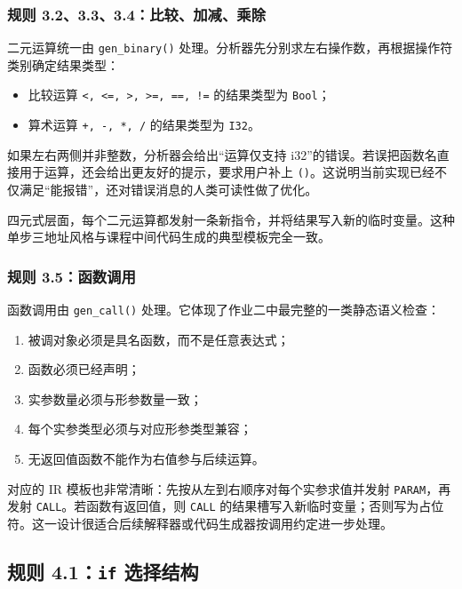 \documentclass[UTF8,a4paper,12pt]{ctexart}
\newcommand{\pkg}[1]{\texttt{#1}}
\newcommand{\op}[1]{\texttt{#1}}
\begin{document}
\subsubsection{规则 3.2、3.3、3.4：比较、加减、乘除}

二元运算统一由 \pkg{gen\_binary()} 处理。分析器先分别求左右操作数，再根据操作符类别确定结果类型：

\begin{itemize}
    \item 比较运算 \pkg{<, <=, >, >=, ==, !=} 的结果类型为 \pkg{Bool}；
    \item 算术运算 \pkg{+, -, *, /} 的结果类型为 \pkg{I32}。
\end{itemize}

如果左右两侧并非整数，分析器会给出“运算仅支持 i32”的错误。若误把函数名直接用于运算，还会给出更友好的提示，要求用户补上 \pkg{()}。这说明当前实现已经不仅满足“能报错”，还对错误消息的人类可读性做了优化。

四元式层面，每个二元运算都发射一条新指令，并将结果写入新的临时变量。这种单步三地址风格与课程中间代码生成的典型模板完全一致。

\subsubsection{规则 3.5：函数调用}

函数调用由 \pkg{gen\_call()} 处理。它体现了作业二中最完整的一类静态语义检查：

\begin{enumerate}[label=\arabic*.]
    \item 被调对象必须是具名函数，而不是任意表达式；
    \item 函数必须已经声明；
    \item 实参数量必须与形参数量一致；
    \item 每个实参类型必须与对应形参类型兼容；
    \item 无返回值函数不能作为右值参与后续运算。
\end{enumerate}

对应的 IR 模板也非常清晰：先按从左到右顺序对每个实参求值并发射 \op{PARAM}，再发射 \op{CALL}。若函数有返回值，则 \op{CALL} 的结果槽写入新临时变量；否则写为占位符。这一设计很适合后续解释器或代码生成器按调用约定进一步处理。

\subsection{规则 4.1：\pkg{if} 选择结构}
\end{document}
